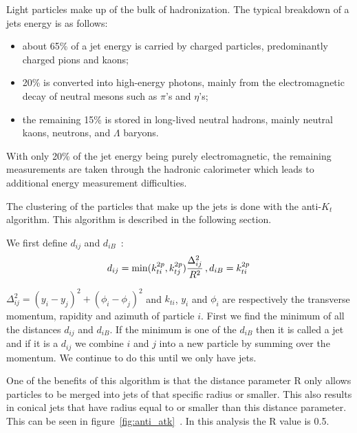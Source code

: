Light particles make up of the bulk of hadronization.  The typical breakdown of a jets energy is as follows:
\begin{itemize}
 \item
about 65\% of a jet energy is carried by charged particles, predominantly
charged pions and kaons;
\item
 20\% is converted into high-energy photons, mainly from the electromagnetic
decay of neutral mesons such as $\pi$'s and $\eta$'s;
\item
 the remaining 15\% is stored in long-lived neutral hadrons, mainly neutral
kaons, neutrons, and $\Lambda$ baryons.~\cite{Pandolfi_thesis}
\end{itemize}

With only 20\% of the jet energy being purely electromagnetic, the remaining measurements are taken through the hadronic calorimeter which leads to additional energy measurement difficulties.

The clustering of the particles that make up the jets is done with the anti-$K_t$ algorithm.  This algorithm is described in the following section. 

We first define $d_{ij}$ and $d_{iB}$~\cite{1126-6708-2008-04-063}:
\begin{equation}
d_{ij} = \min(k_{ti}^{2p}, k_{tj}^{2p}) \frac{\Delta_{ij}^2}{R^2}\,,\\
d_{iB} = k_{ti}^{2p}\,
\end{equation}

$\Delta_{ij}^2 = (y_i-y_j)^2 + (\phi_i - \phi_j)^2$ and $k_{ti}$, $y_i$ and $\phi_i$ are respectively the transverse momentum, rapidity and azimuth of particle $i$. First we find the minimum of all the distances $d_{ij}$ and $d_{iB}$. If the minimum is one of the $d_{iB}$ then it is called a jet and if it is a $d_{ij}$ we combine $i$ and $j$ into a new particle by summing over the momentum.  We continue to do this until we only have jets.

One of the benefits of this algorithm is that the distance parameter R only allows particles to be merged into jets of that specific radius or smaller.  This also results in conical jets that have radius equal to or smaller than this distance parameter. This can be seen in figure~\ref{fig:anti_atk}~\cite{1126-6708-2008-04-063}. In this analysis the R value is 0.5.

